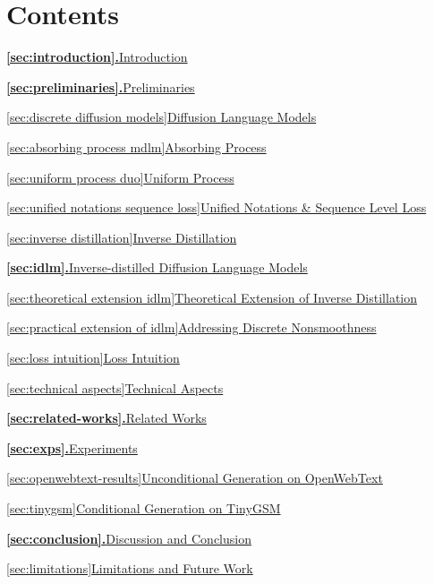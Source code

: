 \documentclass{article}
\theoremstyle{plain}
\theoremstyle{definition}
\theoremstyle{remark}
\begin{document}
\section*{Contents}
\newcommand{\contentsheading}[1]{%
  \vspace{0.8mm}\noindent{\bfseries #1}\par\vspace{0.2mm}%
}
\newcommand{\contentssectionline}[2]{%
  \noindent\hyperref[#1]{\textbf{\ref*{#1}.}\quad #2}\dotfill\pageref*{#1}\par%
}
\newcommand{\contentssubsectionline}[2]{%
  \noindent\hspace*{4mm}\hyperref[#1]{\ref*{#1}\quad #2}\dotfill\pageref*{#1}\par%
}
\newcommand{\contentssubsubsectionline}[2]{%
  \noindent\hspace*{8mm}\hyperref[#1]{\ref*{#1}\quad #2}\dotfill\pageref*{#1}\par%
}
\newcommand{\contentsappendixline}[2]{%
  \noindent\hyperref[#1]{\textbf{Appendix~\ref*{#1}.}\quad #2}\dotfill\pageref*{#1}\par%
}
\newcommand{\contentsplainline}[2]{%
  \noindent\hyperref[#1]{#2}\dotfill\pageref*{#1}\par%
}
\begingroup
\large
\setlength{\parskip}{3pt}
\contentsheading{Main Paper}
\contentssectionline{sec:introduction}{Introduction}
\contentssectionline{sec:preliminaries}{Preliminaries}
\contentssubsectionline{sec:discrete diffusion models}{Diffusion Language Models}
\contentssubsubsectionline{sec:absorbing process mdlm}{Absorbing Process}
\contentssubsubsectionline{sec:uniform process duo}{Uniform Process}
\contentssubsubsectionline{sec:unified notations sequence loss}{Unified Notations \& Sequence Level Loss}
\contentssubsectionline{sec:inverse distillation}{Inverse Distillation}
\contentssectionline{sec:idlm}{Inverse-distilled Diffusion Language Models}
\contentssubsectionline{sec:theoretical extension idlm}{Theoretical Extension of Inverse Distillation}
\contentssubsectionline{sec:practical extension of idlm}{Addressing Discrete Nonsmoothness}
\contentssubsectionline{sec:loss intuition}{Loss Intuition}
\contentssubsectionline{sec:technical aspects}{Technical Aspects}
\contentssectionline{sec:related-works}{Related Works}
\contentssectionline{sec:exps}{Experiments}
\contentssubsectionline{sec:openwebtext-results}{Unconditional Generation on OpenWebText}
\contentssubsectionline{sec:tinygsm}{Conditional Generation on TinyGSM}
\contentssectionline{sec:conclusion}{Discussion and Conclusion}
\contentssubsectionline{sec:limitations}{Limitations and Future Work}
\end{document}
